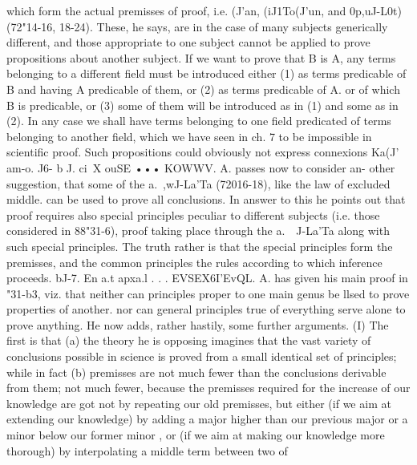 which form the actual premisses of proof, i.e. (J'an, (iJ1To(J'un,
and 0p,uJ-L0t) (72"14-16, 18-24). These, he says, are in the case of
many subjects generically different, and those appropriate to
one subject cannot be applied to prove propositions about
another subject. If we want to prove that B is A, any terms
belonging to a different field must be introduced either (1) as
terms predicable of B and having A predicable of them, or (2)
as terms predicable of A. or of which B is predicable, or (3) some
of them will be introduced as in (1) and some as in (2). In any
case we shall have terms belonging to one field predicated of
terms belonging to another field, which we have seen in ch. 7 to
be impossible in scientific proof. Such propositions could
obviously not express connexions Ka(J' am-o.
J6- b J. ci~X ouSE ••• KOWWV. A. passes now to consider an-
other suggestion, that some of the a.~,wJ-La'Ta (72016-18), like the
law of excluded middle. can be used to prove all conclusions. In
answer to this he points out that proof requires also special
principles peculiar to different subjects (i.e. those considered in
88"31-6), proof taking place through the a.~~J-La'Ta along with such
special principles. The truth rather is that the special principles
form the premisses, and the common principles the rules according
to which inference proceeds.
bJ-7. En a.t apxa.l . . . EVSEX6I'EvQL. A. has given his main
proof in "31-b3, viz. that neither can principles proper to one main
genus be llsed to prove properties of another. nor can general
principles true of everything serve alone to prove anything. He
now adds, rather hastily, some further arguments. (I) The first
is that (a) the theory he is opposing imagines that the vast
variety of conclusions possible in science is proved from a small
identical set of principles; while in fact (b) premisses are not
much fewer than the conclusions derivable from them; not much
fewer, because the premisses required for the increase of our
knowledge are got not by repeating our old premisses, but either
(if we aim at extending our knowledge) by adding a major higher
than our previous major or a minor below our former minor
, or (if we aim at making our knowledge more thorough) by interpolating a middle term between two of
